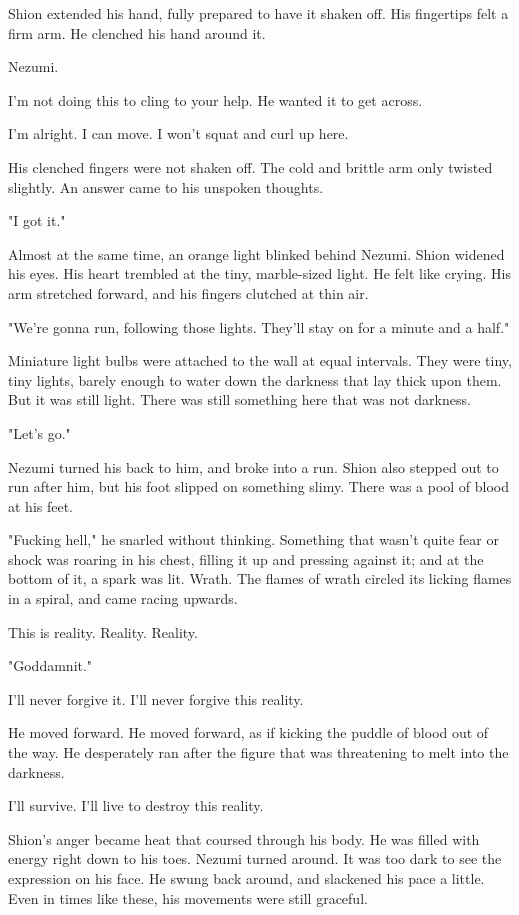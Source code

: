 Shion extended his hand, fully prepared to have it shaken off. His
fingertips felt a firm arm. He clenched his hand around it.

Nezumi.

I'm not doing this to cling to your help. He wanted it to get across.

I'm alright. I can move. I won't squat and curl up here.

His clenched fingers were not shaken off. The cold and brittle arm only
twisted slightly. An answer came to his unspoken thoughts.

"I got it."

Almost at the same time, an orange light blinked behind Nezumi. Shion
widened his eyes. His heart trembled at the tiny, marble-sized light. He
felt like crying. His arm stretched forward, and his fingers clutched at
thin air.

"We're gonna run, following those lights. They'll stay on for a minute
and a half."

Miniature light bulbs were attached to the wall at equal intervals. They
were tiny, tiny lights, barely enough to water down the darkness that
lay thick upon them. But it was still light. There was still something
here that was not darkness.

"Let's go."

Nezumi turned his back to him, and broke into a run. Shion also stepped
out to run after him, but his foot slipped on something slimy. There was
a pool of blood at his feet.

"Fucking hell," he snarled without thinking. Something that wasn't quite
fear or shock was roaring in his chest, filling it up and pressing
against it; and at the bottom of it, a spark was lit. Wrath. The flames
of wrath circled its licking flames in a spiral, and came racing
upwards.

This is reality. Reality. Reality.

"Goddamnit."

I'll never forgive it. I'll never forgive this reality.

He moved forward. He moved forward, as if kicking the puddle of blood
out of the way. He desperately ran after the figure that was threatening
to melt into the darkness.

I'll survive. I'll live to destroy this reality.

Shion's anger became heat that coursed through his body. He was filled
with energy right down to his toes. Nezumi turned around. It was too
dark to see the expression on his face. He swung back around, and
slackened his pace a little. Even in times like these, his movements
were still graceful.

